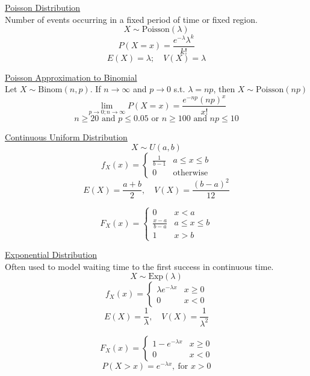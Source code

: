 \documentclass[a4paper,1pt,landscape]{article}
\begin{document}
\begin{multicols}{3}
\underline{Poisson Distribution}\\
Number of events occurring in a fixed period of time or fixed region.
$$X \sim \text{Poisson}(\lambda)$$
$$P(X=x) = \frac{e^{-\lambda}\lambda^k}{k!}$$
$$E(X) = \lambda; \quad V(X) = \lambda$$

\underline{Poisson Approximation to Binomial}\\
Let $X\sim \text{Binom}(n,p)$. If $n \rightarrow \infty$ and $p\rightarrow 0$ s.t. $\lambda = np$, then $X\sim \text{Poisson}(np)$
$$\lim_{p \to 0;n\to \infty} P(X=x) = \frac{e^{-np}(np)^x}{x!}$$
$$n\geq 20 \text{ and } p \leq 0.05 \text{ or } n \geq 100 \text{ and } np\leq 10$$

\underline{Continuous Uniform Distribution}
$$X\sim U(a,b)$$
\begin{equation*}
f_X(x)=
    \begin{cases}
        \frac{1}{b-1} & a\leq x \leq b\\
        0 & \text{otherwise}
    \end{cases}
\end{equation*}
$$E(X) = \frac{a+b}{2}, \quad V(X) = \frac{(b-a)^2}{12}$$

\begin{equation*}
F_X(x)=
    \begin{cases}
        0 & x < a \\
        \frac{x-a}{b-a} & a\leq x \leq b\\
        1 & x > b
    \end{cases}
\end{equation*}

\underline{Exponential Distribution}\\
Often used to model waiting time to the first success in continuous time.
$$X\sim \text{Exp}(\lambda)$$
\begin{equation*}
f_X(x)=
    \begin{cases}
        \lambda e^{-\lambda x} & x \geq 0\\
        0 & x < 0
    \end{cases}
\end{equation*}
$$E(X) = \frac{1}{\lambda}, \quad V(X) = \frac{1}{\lambda^2}$$

\begin{equation*}
F_X(x)=
    \begin{cases}
        1 - e^{-\lambda x} & x \geq 0\\
        0 & x < 0
    \end{cases}
\end{equation*}
$$P(X>x) = e^{-\lambda x},\ \text{for } x>0$$


\end{multicols}
\end{document}
